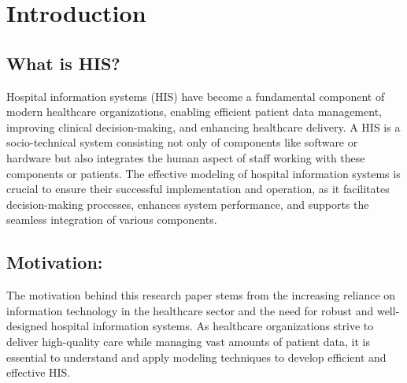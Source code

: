 \chapter{Introduction}










\section{What is HIS?}
Hospital information systems (HIS) have become a fundamental component of modern healthcare organizations, enabling efficient patient data management, improving clinical decision-making, and enhancing healthcare delivery. \cite{HIS} A HIS is a socio-technical system consisting not only of components like software or hardware but also integrates the human aspect of staff working with these components or patients. The effective modeling of hospital information systems is crucial to ensure their successful implementation and operation, as it facilitates decision-making processes, enhances system performance, and supports the seamless integration of various components.

\section{Motivation:}
The motivation behind this research paper stems from the increasing reliance on information technology in the healthcare sector and the need for robust and well-designed hospital information systems. As healthcare organizations strive to deliver high-quality care while managing vast amounts of patient data, it is essential to understand and apply modeling techniques to develop efficient and effective HIS.

